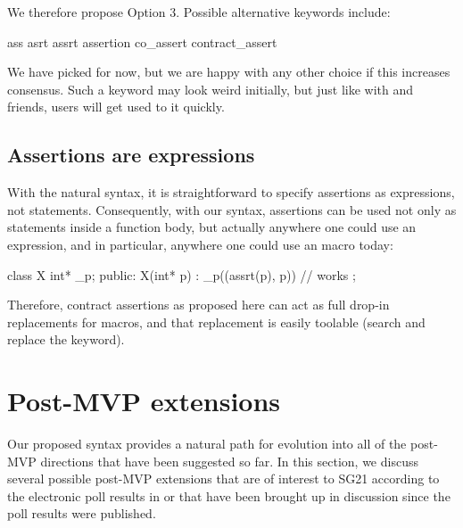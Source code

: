We therefore propose Option 3. Possible alternative keywords include:

\begin{codeblock}
ass                         
asrt                        
assrt                       
assertion                   
co_assert
contract_assert
\end{codeblock}

We have picked  for now, but we are happy with any other choice if this increases consensus. Such a keyword may look weird initially, but just like with  and friends, users will get used to it quickly.


\subsection{Assertions are expressions}
\label{subsec:assrtxpr}

With the natural syntax, it is straightforward to specify assertions as expressions, not statements. Consequently, with our syntax, assertions can be used not only as statements inside a function body, but actually anywhere one could use an expression, and in particular, anywhere one could use an  macro today:

\vspace{2mm}
\begin{codeblock}
class X {
  int* _p;
public:
  X(int* p) : _p((assrt(p), p)) {}  // works
};
\end{codeblock} 
\vspace{2mm}

Therefore, contract assertions as proposed here can act as full drop-in replacements for  macros, and that replacement is easily toolable (search and replace the keyword).


\section{Post-MVP extensions}

Our proposed syntax provides a natural path for evolution into all of the post-MVP directions that have been suggested so far. In this section, we discuss several possible post-MVP extensions that are of interest to SG21 according to the electronic poll results in \cite{P2885R2} or that have been brought up in discussion since the poll results were published.

